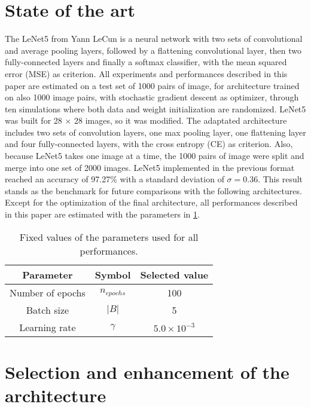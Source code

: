 \documentclass[10pt,conference,compsocconf]{IEEEtran}
\begin{document}
\section{State of the art}
The LeNet5 from Yann LeCun is a neural network with two sets of convolutional and average pooling layers, followed by a flattening convolutional layer, then two fully-connected layers and finally a softmax classifier, with the mean squared error (MSE) as criterion. %
All experiments and performances described in this paper are estimated on a test set of 1000 pairs of image, for architecture trained on also 1000 image pairs, with stochastic gradient descent as optimizer, through ten simulations where both data and weight initialization are randomized.
LeNet5 was built for 28 $\times$ 28 images, so it was modified. The adaptated architecture includes two sets of convolution layers, one max pooling layer, one flattening layer and four fully-connected layers, with the cross entropy (CE) as criterion.
Also, because LeNet5 takes one image at a time, the 1000 pairs of image were split and merge into one set of 2000 images.
LeNet5 implemented in the previous format reached an accuracy of 97.27$\%$ with a standard deviation of $\sigma = 0.36$. 
This result stands as the benchmark for future comparisons with the following architectures.
Except for the optimization of the final architecture, all performances described in this paper are estimated with the parameters in \ref{tab:param}.

\begin{table}[H]
\begin{tabular}{|c|c|c|}
  \hline
  Parameter & Symbol & Selected value \\
  \hline
  Number of epochs & $n_{epochs}$ & 100 \\
  Batch size & $|B|$ & 5 \\
  Learning rate & $\gamma$ & $5.0 \times 10^{-3}$ \\
  \hline
\end{tabular}
\caption{Fixed values of the parameters used for all performances.}
\label{tab:param}
\end{table}


\section{Selection and enhancement of the architecture}
\end{document}
